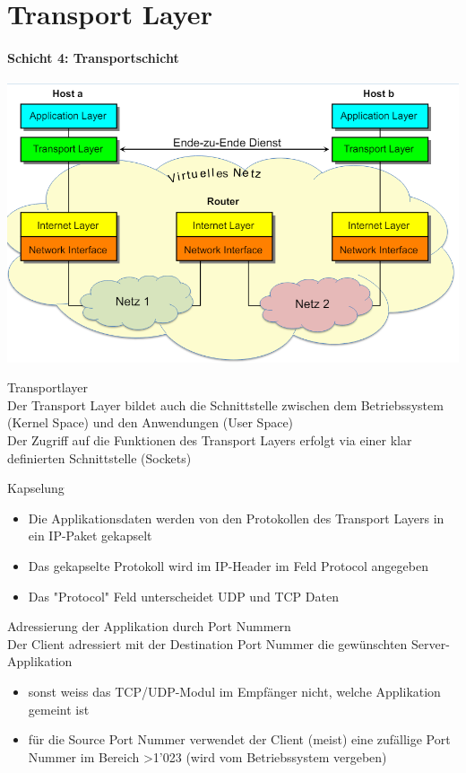 \section{Transport Layer}
\paragraph{Schicht 4: Transportschicht}

\includegraphics[width=0.75\linewidth]{images/transportlayer.png}

\begin{definition}{Transportlayer}\\
    Der Transport Layer bildet auch die Schnittstelle zwischen dem Betriebssystem (Kernel Space) und den Anwendungen (User Space)\\
    Der Zugriff auf die Funktionen des Transport Layers erfolgt via einer klar definierten Schnittstelle (Sockets)
\end{definition}

\begin{definition}{Kapselung}
    \begin{itemize}
        \item Die Applikationsdaten werden von den Protokollen des Transport Layers in ein IP-Paket gekapselt
        \item Das gekapselte Protokoll wird im IP-Header im Feld Protocol angegeben
        \item Das "Protocol" Feld unterscheidet UDP und TCP Daten
    \end{itemize}
\end{definition}

\begin{concept}{Adressierung der Applikation durch Port Nummern}\\
    Der Client adressiert mit der Destination Port Nummer die gewünschten Server-Applikation
    \begin{itemize}
        \item sonst weiss das TCP/UDP-Modul im Empfänger nicht, welche Applikation gemeint ist
        \item für die Source Port Nummer verwendet der Client (meist) eine zufällige Port Nummer im Bereich >1'023 (wird vom Betriebssystem vergeben)
    \end{itemize}
\end{concept}

